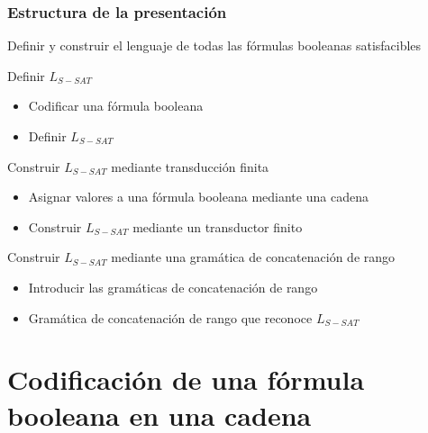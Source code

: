 \documentclass{beamer}
\begin{document}


\begin{frame}
    \frametitle{Estructura de la presentación}
    
    Definir y construir el lenguaje de todas las fórmulas booleanas satisfacibles   
    
    \begin{block}{Definir $L_{S-SAT}$}
        \begin{itemize}
            \item Codificar una fórmula booleana
            \item Definir $L_{S-SAT}$
        \end{itemize}
    \end{block}
    
    
    \begin{block}{Construir $L_{S-SAT}$ mediante transducción finita}
        \begin{itemize}
            \item Asignar valores a una fórmula booleana mediante una cadena
            \item Construir $L_{S-SAT}$ mediante un transductor finito
        \end{itemize}
    \end{block}
    
    
    \begin{block}{Construir $L_{S-SAT}$ mediante una gramática de concatenación de rango}
        \begin{itemize}
            \item Introducir las gramáticas de concatenación de rango
            \item Gramática de concatenación de rango que reconoce $L_{S-SAT}$
        \end{itemize}
    \end{block}
\end{frame}

\section{Codificación de una fórmula booleana en una cadena}
\end{document}
